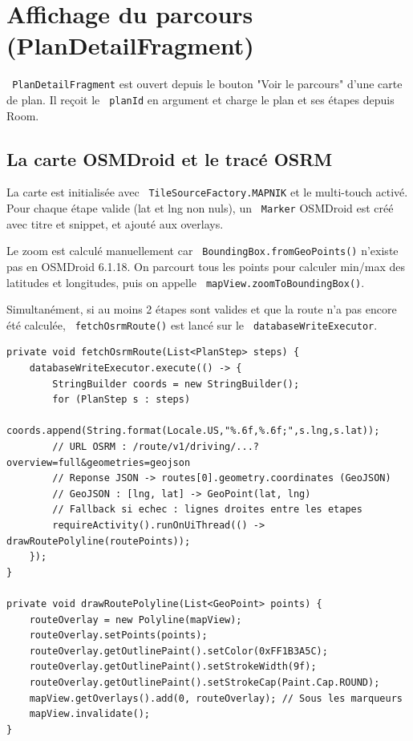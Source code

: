 \documentclass[a4paper,12pt,openany]{report}
\newcommand{\ic}[1]{\texttt{\small\colorbox{lightbg}{\color{navy!90} #1}}}
\begin{document}
\section{Affichage du parcours (PlanDetailFragment)}

\ic{PlanDetailFragment} est ouvert depuis le bouton "Voir le parcours" d'une
carte de plan. Il reçoit le \ic{planId} en argument et charge le plan et ses
étapes depuis Room.

\subsection{La carte OSMDroid et le tracé OSRM}

La carte est initialisée avec \ic{TileSourceFactory.MAPNIK} et le
multi-touch activé. Pour chaque étape valide (lat et lng non nuls), un
\ic{Marker} OSMDroid est créé avec titre et snippet, et ajouté aux overlays.

Le zoom est calculé manuellement car \ic{BoundingBox.fromGeoPoints()} n'existe
pas en OSMDroid 6.1.18. On parcourt tous les points pour calculer min/max des
latitudes et longitudes, puis on appelle \ic{mapView.zoomToBoundingBox()}.

Simultanément, si au moins 2 étapes sont valides et que la route n'a pas encore
été calculée, \ic{fetchOsrmRoute()} est lancé sur le \ic{databaseWriteExecutor}.

\begin{lstlisting}
private void fetchOsrmRoute(List<PlanStep> steps) {
    databaseWriteExecutor.execute(() -> {
        StringBuilder coords = new StringBuilder();
        for (PlanStep s : steps)
            coords.append(String.format(Locale.US,"%.6f,%.6f;",s.lng,s.lat));
        // URL OSRM : /route/v1/driving/...?overview=full&geometries=geojson
        // Reponse JSON -> routes[0].geometry.coordinates (GeoJSON)
        // GeoJSON : [lng, lat] -> GeoPoint(lat, lng)
        // Fallback si echec : lignes droites entre les etapes
        requireActivity().runOnUiThread(() -> drawRoutePolyline(routePoints));
    });
}

private void drawRoutePolyline(List<GeoPoint> points) {
    routeOverlay = new Polyline(mapView);
    routeOverlay.setPoints(points);
    routeOverlay.getOutlinePaint().setColor(0xFF1B3A5C);
    routeOverlay.getOutlinePaint().setStrokeWidth(9f);
    routeOverlay.getOutlinePaint().setStrokeCap(Paint.Cap.ROUND);
    mapView.getOverlays().add(0, routeOverlay); // Sous les marqueurs
    mapView.invalidate();
}
\end{lstlisting}
\end{document}
